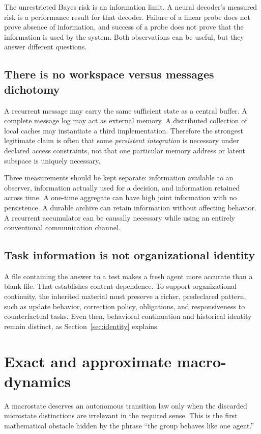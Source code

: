 \documentclass[11pt,letterpaper]{article}
\theoremstyle{plain}
\theoremstyle{definition}
\theoremstyle{remark}
\begin{document}
The unrestricted Bayes risk is an information limit. A neural decoder's measured risk is a performance result for that decoder. Failure of a linear probe does not prove absence of information, and success of a probe does not prove that the information is used by the system. Both observations can be useful, but they answer different questions.

\subsection{There is no workspace versus messages dichotomy}
A recurrent message may carry the same sufficient state as a central buffer. A complete message log may act as external memory. A distributed collection of local caches may instantiate a third implementation. Therefore the strongest legitimate claim is often that some \emph{persistent integration} is necessary under declared access constraints, not that one particular memory address or latent subspace is uniquely necessary.

Three measurements should be kept separate: information available to an observer, information actually used for a decision, and information retained across time. A one-time aggregate can have high joint information with no persistence. A durable archive can retain information without affecting behavior. A recurrent accumulator can be causally necessary while using an entirely conventional communication channel.

\subsection{Task information is not organizational identity}
A file containing the answer to a test makes a fresh agent more accurate than a blank file. That establishes content dependence. To support organizational continuity, the inherited material must preserve a richer, predeclared pattern, such as update behavior, correction policy, obligations, and responsiveness to counterfactual tasks. Even then, behavioral continuation and historical identity remain distinct, as Section~\ref{sec:identity} explains.

\section{Exact and approximate macro-dynamics}\label{sec:closure}
A macrostate deserves an autonomous transition law only when the discarded microstate distinctions are irrelevant in the required sense. This is the first mathematical obstacle hidden by the phrase ``the group behaves like one agent.''
\end{document}
